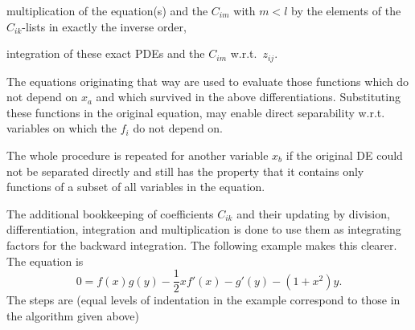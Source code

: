 \documentclass[12pt]{article}
\begin{document}
\begin{description}
 \begin{description}
  \item multiplication of the equation(s) and the $C_{im}$ with 
        $m<l$ by the elements
  of the $C_{ik}$-lists in exactly the inverse order,
  \item integration of these exact PDEs and the $C_{im}$ w.r.t.\ $z_{ij}$.
 \end{description}
 \item The equations originating that way are used to evaluate those
 functions which do not depend on $x_a$ and which survived in the above
 differentiations. Substituting these functions in the original equation,
 may enable direct separability w.r.t. variables on which the $f_i$
 do not depend on.
 \item The whole procedure is repeated for another variable $x_b$ if the
 original DE could not be separated directly and still has the property that 
 it contains only functions of a subset of all variables in the equation.
\end{description}
The additional bookkeeping of coefficients $C_{ik}$ and their updating by
division, differentiation, integration and multiplication is done to use
them as integrating factors for the backward integration.
The following example makes this clearer. The equation is
\begin{equation}
0 = f(x) g(y) - \frac{1}{2}xf'(x) - g'(y) - (1+x^2)y. \label{isep}
\end{equation}
The steps are (equal levels of indentation in the example correspond to
those in the algorithm given above)
\end{document}
